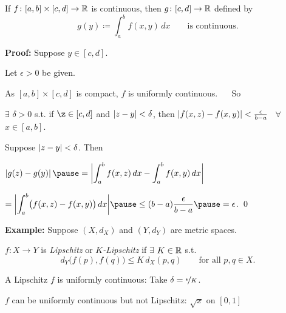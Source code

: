 \documentclass[10pt,aspectratio=149]{beamer}
\begin{document}
\begin{frame}

\begin{proposition}
If $f \colon [a,b] \times [c,d] \to {\mathbb{R}}$ is continuous,
then $g \colon [c,d] \to {\mathbb{R}}$ defined by
\begin{equation*}
g(y) \coloneqq \int_a^b f(x,y) \,dx  \qquad \text{is continuous}.
\end{equation*}
\end{proposition}

\pause
\textbf{Proof:}
Suppose $y \in [c,d]$.

\pause
\medskip

Let $\epsilon > 0$ be given.

\pause
\medskip

As $[a,b] \times [c,d]$ is compact, $f$
is uniformly continuous.
\pause
~~ So

$\exists$ $\delta > 0$ s.t.
if $\z \in [c,d]$ and
$\left\lvert {z-y} \right\rvert < \delta$, then
$\left\lvert {f(x,z)-f(x,y)} \right\rvert < \frac{\epsilon}{b-a}$ ~$\forall$ $x \in [a,b]$.

\pause
\medskip

Suppose $\left\lvert {z-y} \right\rvert < \delta$.
\pause
Then

\medskip

$\displaystyle
\abs{
g(z)-
g(y)
}
\pause
=
\bbabs{
\int_a^b 
f(x,z) \,dx 
-
\int_a^b 
f(x,y) \,dx 
}$

\pause
\medskip

\hfill
\hfill
\hfill
$\displaystyle
=
\bbabs{
\int_a^b 
\bigl(
f(x,z) - f(x,y)
\bigr)
\,dx 
}
\pause
\leq
(b-a)
\frac{\epsilon}{b-a}
\pause
= \epsilon$.
\qed

\end{frame}

\begin{frame}

\textbf{Example:}
Suppose $(X,d_X)$ and $(Y,d_Y)$ are metric spaces.

\pause
\medskip


$f \colon X \to Y$ is \emph{Lipschitz} or \emph{$K$-Lipschitz} if $\exists$
$K \in {\mathbb{R}}$ s.t.
\[
d_Y\bigl(f(p),f(q)\bigr) \leq K\, d_X(p,q)
\qquad \text{for all } p,q \in X.
\]

\pause
A Lipschitz $f$ is uniformly continuous:
\pause
Take $\delta = \nicefrac{\epsilon}{K}$.

\pause
\medskip

$f$ can be uniformly continuous but not Lipschitz:
\pause
$\sqrt{x}$ on $[0,1]$

\end{frame}
\end{document}
